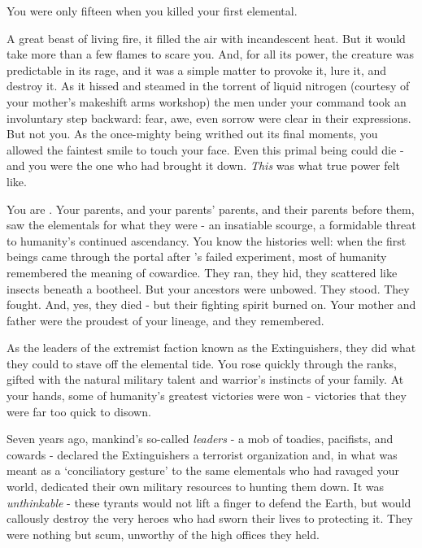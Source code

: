 \documentclass[char]{elementals}
\begin{document}
\name{\cDema{}}

You were only fifteen when you killed your first elemental. 

A great beast of living fire, it filled the air with incandescent heat. But it would take more than a few flames to scare you. And, for all its power, the creature was predictable in its rage, and it was a simple matter to provoke it, lure it, and destroy it. As it hissed and steamed in the torrent of liquid nitrogen (courtesy of your mother’s makeshift arms workshop) the men under your command took an involuntary step backward: fear, awe, even sorrow were clear in their expressions. But not you. As the once-mighty being writhed out its final moments, you allowed the faintest smile to touch your face. Even this primal being could die - and you were the one who had brought it down. \emph{This} was what true power felt like.

You are \cDema{}. Your parents, and your parents’ parents, and their parents before them, saw the elementals for what they were - an insatiable scourge, a formidable threat to humanity’s continued ascendancy. You know the histories well: when the first beings came through the portal after \cGrandfather{}’s failed experiment, most of humanity remembered the meaning of cowardice. They ran, they hid, they scattered like insects beneath a bootheel. But your ancestors were unbowed. They stood. They fought. And, yes, they died - but their fighting spirit burned on. Your mother and father were the proudest of your lineage, and they remembered.

As the leaders of the extremist faction known as the Extinguishers, they did what they could to stave off the elemental tide. You rose quickly through the ranks, gifted with the natural military talent and warrior’s instincts of your family. At your hands, some of humanity’s greatest victories were won - victories that they were far too quick to disown. 

Seven years ago, mankind’s so-called \emph{leaders} - a mob of toadies, pacifists, and cowards - declared the Extinguishers a terrorist organization and, in what was meant as a ‘conciliatory gesture’ to the same elementals who had ravaged your world, dedicated their own military resources to hunting them down. It was \emph{unthinkable} - these tyrants would not lift a finger to defend the Earth, but would callously destroy the very heroes who had sworn their lives to protecting it. They were nothing but scum, unworthy of the high offices they held.
\end{document}
